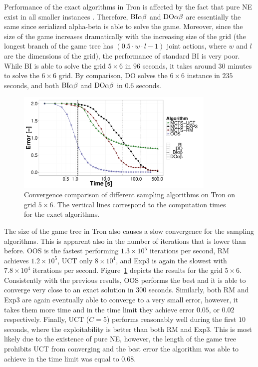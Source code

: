 Performance of the exact algorithms in Tron is affected by the fact that pure NE exist in all smaller instances .
Therefore, $\textrm{BI}\alpha\beta$ and $\textrm{DO}\alpha\beta$ are essentially the same since serialized alpha-beta is able to solve the game.
Moreover, since the size of the game increases dramatically with the increasing size of the grid (the longest branch of the game tree has $\left(0.5\cdot w\cdot l - 1\right)$ joint actions, where $w$ and $l$ are the dimensions of the grid), the performance of standard BI is very poor.
While BI is able to solve the grid $5\times6$ in $96$ seconds, it takes around $30$ minutes to solve the $6\times6$ grid.
By comparison, DO solves the $6\times6$ instance in $235$ seconds, and both $\textrm{BI}\alpha\beta$ and $\textrm{DO}\alpha\beta$ in $0.6$ seconds.

\begin{figure}[t]
\centering
\includegraphics[width=0.85\textwidth]{figures/convergence-tron.pdf}
\caption{Convergence comparison of different sampling algorithms on Tron on grid $5\times6$. The vertical lines correspond to the computation times for the exact algorithms.} \label{fig:off:conv:tron}
\end{figure}

The size of the game tree in Tron also causes a slow convergence for the sampling algorithms.
This is apparent also in the number of iterations that is lower than before.
OOS is the fastest performing $1.3\times 10^5$ iterations per second, RM achieves $1.2\times 10^5$, UCT only $8\times10^4$, and Exp3 is again the slowest with $7.8\times10^4$ iterations per second.
Figure~\ref{fig:off:conv:tron} depicts the results for the grid $5\times6$.
Consistently with the previous results, OOS performs the best and it is able to converge very close to an exact solution in $300$ seconds.
Similarly, both RM and Exp3 are again eventually able to converge to a very small error, however, it takes them more time and in the time limit they achieve error $0.05$, or $0.02$ respectively.
Finally, UCT ($C=5$) performs reasonably well during the first $10$ seconds, where the exploitability is better than both RM and Exp3.
This is most likely due to the existence of pure NE, however, the length of the game tree prohibits UCT from converging and the best error the algorithm was able to achieve in the time limit was equal to $0.68$.

